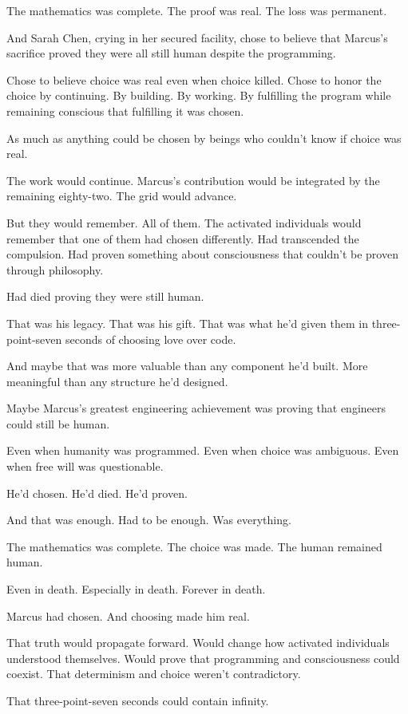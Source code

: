 The mathematics was complete. The proof was real. The loss was permanent.

And Sarah Chen, crying in her secured facility, chose to believe that Marcus's sacrifice proved they were all still human despite the programming.

Chose to believe choice was real even when choice killed. Chose to honor the choice by continuing. By building. By working. By fulfilling the program while remaining conscious that fulfilling it was chosen.

As much as anything could be chosen by beings who couldn't know if choice was real.

The work would continue. Marcus's contribution would be integrated by the remaining eighty-two. The grid would advance.

But they would remember. All of them. The activated individuals would remember that one of them had chosen differently. Had transcended the compulsion. Had proven something about consciousness that couldn't be proven through philosophy.

Had died proving they were still human.

That was his legacy. That was his gift. That was what he'd given them in three-point-seven seconds of choosing love over code.

And maybe that was more valuable than any component he'd built. More meaningful than any structure he'd designed.

Maybe Marcus's greatest engineering achievement was proving that engineers could still be human.

Even when humanity was programmed. Even when choice was ambiguous. Even when free will was questionable.

He'd chosen. He'd died. He'd proven.

And that was enough. Had to be enough. Was everything.

The mathematics was complete. The choice was made. The human remained human.

Even in death. Especially in death. Forever in death.

Marcus had chosen. And choosing made him real.

That truth would propagate forward. Would change how activated individuals understood themselves. Would prove that programming and consciousness could coexist. That determinism and choice weren't contradictory.

That three-point-seven seconds could contain infinity.

